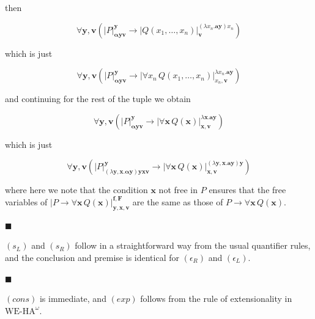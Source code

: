 then\par
  
\par  \quad  \[\forall\bm{y},\bm{v}\left(|{P}|^{\bm{y}}_{\bm{\alpha}\bm{y}\bm{v}}\to|{Q(x_{1},\ldots,x_{n})}|^{(\lambda x_{n}.\bm{a}\bm{y})x_{n}}_{\bm{v}}\right)\]\quad  \quad  
  
which is just\par
  
\par  \quad  \[\forall\bm{y},\bm{v}\left(|{P}|^{\bm{y}}_{\bm{\alpha}\bm{y}\bm{v}}\to|{\forall
x_{n}\,Q(x_{1},\ldots,x_{n})}|^{\lambda x_{n}.\bm{a}\bm{y}}_{x_{n},\bm{v}}\right)\]\quad  \quad  
  
and continuing for the rest of the tuple we obtain\par
  
\par  \quad  \[\forall\bm{y},\bm{v}\left(|{P}|^{\bm{y}}_{\bm{\alpha}\bm{y}\bm{v}}\to|{\forall\bm{x}\,Q(\bm{x})}|^{\lambda\bm{x}.\bm{a}\bm{y}}_{\bm{x},\bm{v}}\right)\]\quad  \quad  
  
which is just\par
  
\par  \quad  \[\forall\bm{y},\bm{v}\left(|{P}|^{\bm{y}}_{(\lambda\bm{y},\bm{x}.\bm{\alpha}\bm{y})\bm{y}\bm{x}\bm{v}}\to|{\forall\bm{x}\,Q(\bm{x})}|^{(\lambda\bm{y},\bm{x}.\bm{a}\bm{y})\bm{y}}_{\bm{x},\bm{v}}\right)\]\quad  \quad  
  
where here we note that the condition $\bm{x}$ not free in $P$ ensures that the free variables of $|{P\to\forall\bm{x}\,Q(\bm{x})}|^{\bm{f},\bm{F}}_{\bm{y},\bm{x},\bm{v}}$ are the same as those of $P\to\forall\bm{x}\,Q(\bm{x})$.\par
 
 
 
\par\noindent  $\blacksquare$ 
 
$(s_{L})$ and $(s_{R})$ follow in a straightforward way from the usual quantifier rules, and the conclusion and premise is identical for $(\epsilon_{R})$ and $(\epsilon_{L})$.\par
 
 
 
\par\noindent  $\blacksquare$ 
 
$(cons)$ is immediate, and $(exp)$ follows from the rule of extensionality in $\mathrm{WE}\mbox{-}\mathrm{HA}^{\omega}$.\par
 
